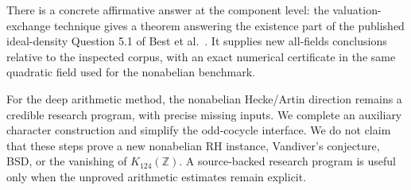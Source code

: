 There is a concrete affirmative answer at the component level: the
valuation-exchange technique gives a theorem answering the existence
part of the published ideal-density Question 5.1 of Best
et al.~\cite{best}. It supplies new all-fields conclusions relative
to the inspected corpus, with an exact numerical certificate in the
same quadratic field used for the nonabelian benchmark.

For the deep arithmetic method, the nonabelian Hecke/Artin direction
remains a credible research program, with precise missing inputs.
We complete an auxiliary character construction and simplify the
odd-cocycle interface. We do not claim that these steps prove a new
nonabelian RH instance, Vandiver's conjecture, BSD, or the vanishing of
$K_{124}(\mathbb Z)$. A source-backed research program is useful only
when the unproved arithmetic estimates remain explicit.
